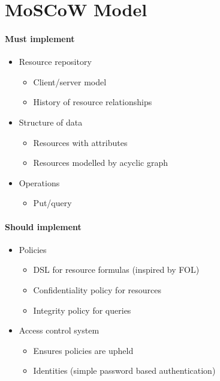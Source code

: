 \appendix
\section{MoSCoW Model}
\paragraph{Must implement}
\begin{itemize}
    \item Resource repository
    \begin{itemize}
        \item Client/server model
        \item History of resource relationships
    \end{itemize}
    \item Structure of data
    \begin{itemize}
        \item Resources with attributes
        \item Resources modelled by acyclic graph
    \end{itemize}
    \item Operations
    \begin{itemize}
        \item Put/query
    \end{itemize}
\end{itemize}

\paragraph{Should implement}
\begin{itemize}
    \item Policies
    \begin{itemize}
        \item DSL for resource formulas (inspired by FOL)
        \item Confidentiality policy for resources
        \item Integrity policy for queries
    \end{itemize}
    \item Access control system
    \begin{itemize}
        \item Ensures policies are upheld
        \item Identities (simple password based authentication)
    \end{itemize}
\end{itemize}

